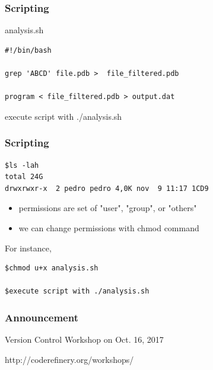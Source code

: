 \begin{frame}[fragile]
	\frametitle{Scripting}

\begin{block}{analysis.sh}
\begin{verbatim}
#!/bin/bash

grep 'ABCD' file.pdb >  file_filtered.pdb 

program < file_filtered.pdb > output.dat

\end{verbatim}
\end{block}

execute script with ./analysis.sh

\end{frame}

\begin{frame}[fragile]
	\frametitle{Scripting}

\begin{verbatim}
$ls -lah
total 24G
drwxrwxr-x  2 pedro pedro 4,0K nov  9 11:17 1CD9
\end{verbatim}

\begin{itemize}
\item permissions are set of "user", "group", or "others"
\item we can change permissions with chmod command
\end{itemize}

For instance, 

\begin{verbatim}
$chmod u+x analysis.sh

$execute script with ./analysis.sh
\end{verbatim}

\end{frame}


\begin{frame}[fragile]
	\frametitle{Announcement}

Version Control Workshop on Oct. 16, 2017

http://coderefinery.org/workshops/

\end{frame}

